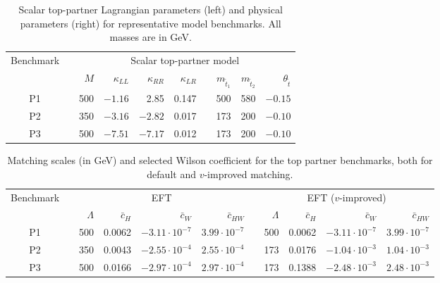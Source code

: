 \begin{table}[t] \renewcommand{\arraystretch}{1.2} \centering
\begin{tabular}{c c rrrr c rrr} \toprule \multirow{2}{*}{Benchmark}
&\hspace*{1em}& \multicolumn{8}{c}{Scalar top-partner model} \\
\cmidrule{3-10} && $M$ & $\kappa_{LL}$ & $\kappa_{RR}$ & $\kappa_{LR}$
&\hspace*{1em}& $m_{\tilde{t}_{1}}$ & $m_{{\tilde{t}_{2}}}$ &
$\theta_{\tilde{t}}$ \\ \midrule P1 && 500 & $-1.16$ & 2.85 & 0.147 &&
500 & 580 & $-0.15$ \\ P2 && 350 & $-3.16$ & $-2.82$ & 0.017 && 173 &
200 & $-0.10$ \\ P3 && 500 & $-7.51$ & $-7.17$ & 0.012 && 173 & 200 &
$-0.10$ \\ \bottomrule
 \end{tabular}
 \caption{Scalar top-partner Lagrangian parameters (left) and physical
parameters (right) for representative model benchmarks. All masses are
in GeV.}
  \label{tab:partner-benchmarks}
\end{table}

\begin{table}[t] \renewcommand{\arraystretch}{1.2}
\setlength{\tabcolsep}{0.45em} \centering
  \begin{tabular}{c c rrrr c rrrr} \toprule \multirow{2}{*}{Benchmark}
&\hspace*{1em}& \multicolumn{4}{c}{EFT} &\hspace*{1em}&
\multicolumn{4}{c}{EFT ($v$-improved)} \\ \cmidrule{3-6}
\cmidrule{8-11} && $\Lambda$ & $\bar{c}_H$ & $\bar{c}_W$ &
$\bar{c}_{HW}$ && $\Lambda$ & $\bar{c}_H$ & $\bar{c}_W$ &
$\bar{c}_{HW}$ \\ \midrule P1 && 500 & 0.0062 & $-3.11 \cdot 10^{-7}$
& $3.99 \cdot 10^{-7}$ && 500 & 0.0062 & $-3.11 \cdot 10^{-7}$ & $3.99
\cdot 10^{-7}$ \\ P2 && 350 & 0.0043 & $-2.55 \cdot 10^{-4}$ & $2.55
\cdot 10^{-4}$ && 173 & 0.0176 & $-1.04 \cdot 10^{-3}$ & $1.04 \cdot
10^{-3}$\\ P3 && 500 & 0.0166 & $-2.97 \cdot 10^{-4}$ & $2.97 \cdot
10^{-4}$ && 173 & 0.1388 & $-2.48 \cdot 10^{-3}$ & $2.48 \cdot
10^{-3}$ \\ \bottomrule
  \end{tabular} \setlength{\tabcolsep}{0.5em}
  \caption{Matching scales (in GeV) and selected Wilson coefficient
for the top partner benchmarks, both for default and $v$-improved
matching.}
  \label{tab:partner-EFT}
\end{table}

